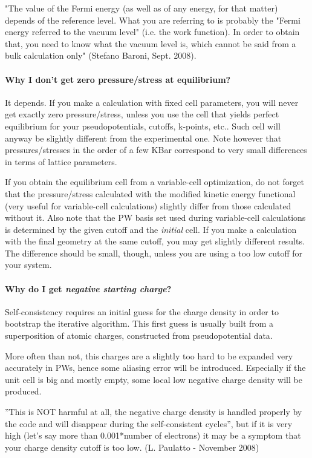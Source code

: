 \documentclass[12pt,a4paper]{article}
\begin{document}
"The value of the Fermi energy (as well as of any energy, for that
matter) depends of the reference level. What you are referring to is
probably the "Fermi energy referred to the vacuum level" (i.e.  
the work function). In order to obtain that, you need to know what the
vacuum level is, which cannot be said from a bulk calculation only"
(Stefano Baroni, Sept. 2008). 

\paragraph{Why I don't get zero pressure/stress at equilibrium?}

It depends. If you make a calculation with fixed cell parameters, you
will never get exactly zero pressure/stress, unless you use the cell
that yields perfect equilibrium for your pseudopotentials,  cutoffs,
k-points, etc.. Such cell will anyway be slightly different from the
experimental one. Note however that pressures/stresses in the order of
a few KBar correspond to very small differences in terms of lattice parameters.

If you obtain the equilibrium cell from a variable-cell optimization,
do not forget that the pressure/stress calculated with the modified
kinetic energy functional (very useful for variable-cell calculations)
slightly differ from those calculated without it. Also note that the
PW basis set used during variable-cell calculations is
determined by the given cutoff and the {\em initial} cell. If you
make a calculation with the final geometry at the same cutoff,
you may get slightly different  results. The difference should
be small, though, unless you are using a too low cutoff for your
system.

\paragraph{Why do I get {\em negative starting charge}?}
Self-consistency requires an initial guess for the charge density in
order to bootstrap the iterative algorithm. This first guess is
usually built from a superposition of atomic charges, constructed from
pseudopotential data. 

More often than not, this charges are a slightly too hard to be
expanded very accurately in PWs, hence some aliasing error
will be introduced. Especially if the unit cell is big and mostly
empty, some local low negative charge density will be produced. 

''This is NOT harmful at all, the negative charge density is handled
properly by the code and will disappear during the self-consistent
cycles'', but if it is very high (let's say more than 0.001*number of
electrons) it may be a symptom that your charge density cutoff is too
low. (L. Paulatto - November 2008)
\end{document}
